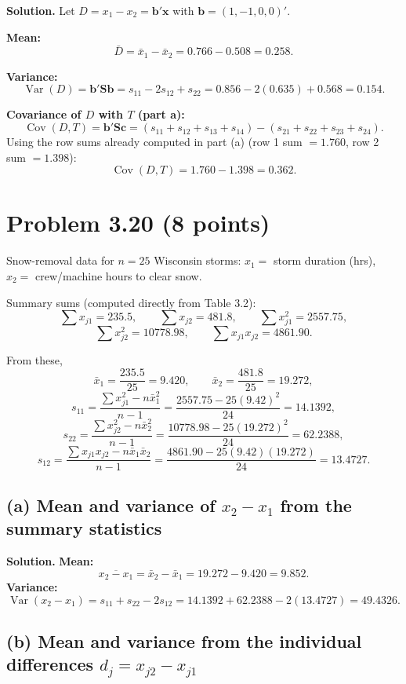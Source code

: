 \documentclass[11pt]{article}
\newcommand{\bx}{\mathbf{x}}
\newcommand{\bS}{\mathbf{S}}
\newenvironment{sol}{\par\noindent\textbf{Solution.}\quad}{\par\medskip}
\begin{document}
\begin{sol}
Let $D = x_1-x_2 = \mathbf{b}'\bx$ with $\mathbf{b}=(1,-1,0,0)'$.

\textbf{Mean:}
\[
\bar D = \bar x_1 - \bar x_2 = 0.766-0.508 = 0.258.
\]

\textbf{Variance:}
\[
\operatorname{Var}(D) = \mathbf{b}'\bS\mathbf{b} = s_{11}-2s_{12}+s_{22} = 0.856 - 2(0.635) + 0.568 = 0.154.
\]

\textbf{Covariance of $D$ with $T$ (part a):}
\[
\operatorname{Cov}(D,T) = \mathbf{b}'\bS\mathbf{c} = (s_{11}+s_{12}+s_{13}+s_{14}) - (s_{21}+s_{22}+s_{23}+s_{24}).
\]
Using the row sums already computed in part (a) (row 1 sum $=1.760$, row 2 sum $=1.398$):
\[
\operatorname{Cov}(D,T) = 1.760 - 1.398 = \boxed{0.362}.
\]
\end{sol}

\clearpage
\section{Problem 3.20 (8 points)}

Snow-removal data for $n=25$ Wisconsin storms: $x_1=$ storm duration (hrs), $x_2=$ crew/machine hours to clear snow.

Summary sums (computed directly from Table 3.2):
\[
\sum x_{j1} = 235.5,\qquad \sum x_{j2}=481.8,\qquad \sum x_{j1}^2 = 2557.75,
\]
\[
\sum x_{j2}^2 = 10778.98,\qquad \sum x_{j1}x_{j2}=4861.90.
\]

From these,
\[
\bar x_1 = \frac{235.5}{25}=9.420, \qquad \bar x_2 = \frac{481.8}{25}=19.272,
\]
\[
s_{11} = \frac{\sum x_{j1}^2 - n\bar x_1^2}{n-1} = \frac{2557.75 - 25(9.42)^2}{24} = 14.1392,
\]
\[
s_{22} = \frac{\sum x_{j2}^2 - n\bar x_2^2}{n-1} = \frac{10778.98-25(19.272)^2}{24} = 62.2388,
\]
\[
s_{12} = \frac{\sum x_{j1}x_{j2}-n\bar x_1\bar x_2}{n-1} = \frac{4861.90-25(9.42)(19.272)}{24} = 13.4727.
\]

\subsection*{(a) Mean and variance of $x_2-x_1$ from the summary statistics}

\begin{sol}
\textbf{Mean:}
\[
\overline{x_2-x_1} = \bar x_2-\bar x_1 = 19.272-9.420 = 9.852.
\]
\textbf{Variance:}
\[
\operatorname{Var}(x_2-x_1) = s_{11}+s_{22}-2s_{12} = 14.1392+62.2388-2(13.4727) = \boxed{49.4326}.
\]
\end{sol}

\subsection*{(b) Mean and variance from the individual differences $d_j = x_{j2}-x_{j1}$}
\end{document}
